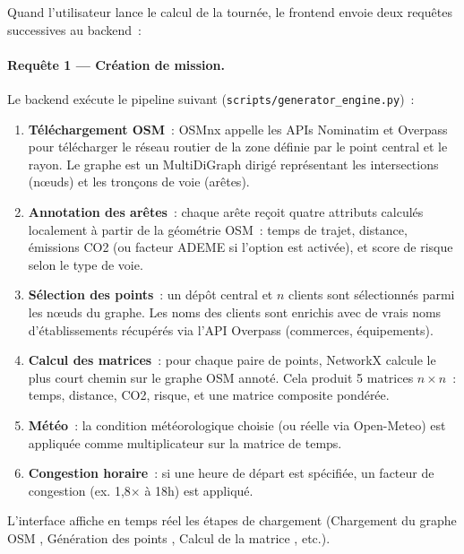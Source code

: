 \documentclass[a4paper, 12pt, twoside]{article}
\begin{document}
Quand l'utilisateur lance le calcul de la tourn\'{e}e, le frontend
envoie deux requ\^{e}tes successives au backend~:

\paragraph{Requ\^{e}te 1 --- Cr\'{e}ation de mission.}
Le backend ex\'{e}cute le pipeline suivant (\texttt{scripts/generator\_engine.py})~:

\begin{enumerate}
  \item \textbf{T\'{e}l\'{e}chargement OSM}~: OSMnx appelle les APIs Nominatim et Overpass pour
        t\'{e}l\'{e}charger le r\'{e}seau routier de la zone d\'{e}finie par le point central et
        le rayon. Le graphe est un MultiDiGraph dirig\'{e} repr\'{e}sentant les intersections
        (n\oe uds) et les tron\c{c}ons de voie (ar\^{e}tes).
  \item \textbf{Annotation des ar\^{e}tes}~: chaque ar\^{e}te re\c{c}oit quatre attributs calcul\'{e}s
        localement \`{a} partir de la g\'{e}om\'{e}trie OSM~: temps de trajet, distance, \'{e}missions
        CO2 (ou facteur ADEME si l'option est activ\'{e}e), et score de risque selon le type de voie.
  \item \textbf{S\'{e}lection des points}~: un d\'{e}p\^{o}t central et $n$ clients sont s\'{e}lectionn\'{e}s
        parmi les n\oe uds du graphe. Les noms des clients sont enrichis avec de vrais noms
        d'\'{e}tablissements r\'{e}cup\'{e}r\'{e}s via l'API Overpass (commerces, \'{e}quipements).
  \item \textbf{Calcul des matrices}~: pour chaque paire de points, NetworkX calcule le plus court
        chemin sur le graphe OSM annot\'{e}. Cela produit 5 matrices $n \times n$~: temps, distance,
        CO2, risque, et une matrice composite pond\'{e}r\'{e}e.
  \item \textbf{M\'{e}t\'{e}o}~: la condition m\'{e}t\'{e}orologique choisie (ou r\'{e}elle via
        Open-Meteo) est appliqu\'{e}e comme multiplicateur sur la matrice de temps.
  \item \textbf{Congestion horaire}~: si une heure de d\'{e}part est sp\'{e}cifi\'{e}e, un facteur
        de congestion (ex. 1,8$\times$ \`{a} 18h) est appliqu\'{e}.
\end{enumerate}

L'interface affiche en temps r\'{e}el les \'{e}tapes de chargement (\og Chargement du graphe OSM \fg{},
\og G\'{e}n\'{e}ration des points \fg{}, \og Calcul de la matrice \fg{}, etc.).
\end{document}
